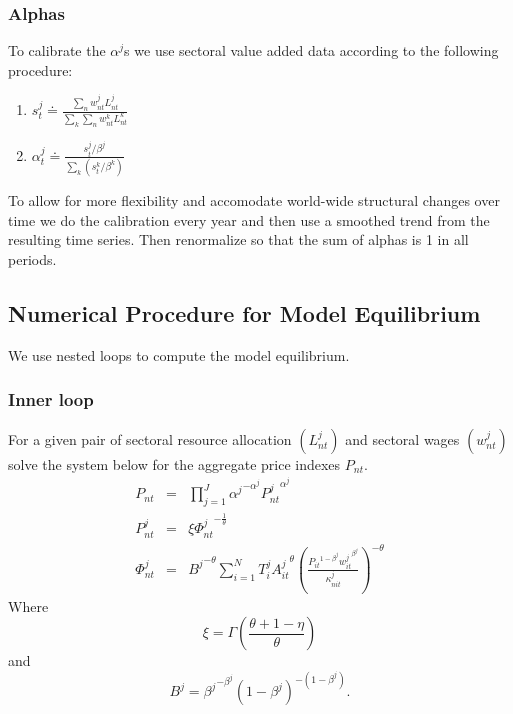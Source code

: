 \documentclass[12pt]{article}
\begin{document}
\subsubsection{Alphas}

To calibrate the $\alpha^{j}$s we use sectoral value added data according to
the following procedure:

\begin{enumerate}
\item $s^j_{t} \doteq \frac{\sum_n w^j_{nt} L^j_{nt}}{\sum_k \sum_n w^k_{nt}
L^k_{nt}}$

\item $\alpha^j_t \doteq \frac{s^j_{t} / \beta^j}{\sum_k (s^k_{t} / \beta^k)}
$
\end{enumerate}

To allow for more flexibility and accomodate world-wide structural changes
over time we do the calibration every year and then use a smoothed trend
from the resulting time series. Then renormalize so that the sum of alphas
is 1 in all periods.

\subsection{Numerical Procedure for Model Equilibrium}

We use nested loops to compute the model equilibrium.

\subsubsection{Inner loop}

For a given pair of sectoral resource allocation $(L_{nt}^j)$ and sectoral
wages $(w_{nt}^j)$ solve the system below for the aggregate price indexes $%
P_{nt}.$ 
\begin{eqnarray}
P_{nt} &=& \prod_{j = 1}^J {\alpha^j}^{- \alpha^j} {P_{nt}^j}^{\alpha^j}
\label{aggr1} \\
P_{nt}^j &=& \xi {\Phi_{nt}^j}^{-\frac{1}{\theta}}  \label{aggr2} \\
\Phi_{nt}^j &=& {B^j}^{-\theta} \sum_{i = 1}^N T_i^j {A_{it}^j}^{\theta}
\left(\frac{{P_{it}}^{1 - \beta^j} {w_{it}^j}^{\beta^j}}{\kappa_{nit}^j}%
\right)^{-\theta}
\end{eqnarray}
Where 
\begin{equation*}
\xi = \Gamma\left(\frac{\theta + 1 - \eta}{\theta}\right)
\end{equation*}
and 
\begin{equation*}
B^j = {\beta^j}^{- \beta^j} (1 - \beta^j)^{-(1 - \beta^j)}.
\end{equation*}
\end{document}
